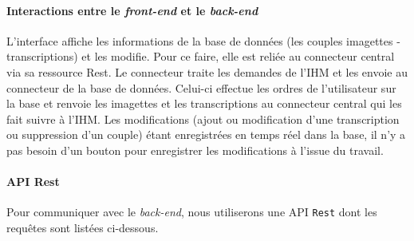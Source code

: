 \paragraph{Interactions entre le \textit{front-end} et le \textit{back-end}}

L’interface affiche les informations de la base de données (les couples imagettes - transcriptions) et les modifie. Pour ce faire, elle est reliée au connecteur central via sa ressource Rest. Le connecteur traite les demandes de l’IHM et les envoie au connecteur de la base de données. Celui-ci effectue les ordres de l’utilisateur sur la base et renvoie les imagettes et les transcriptions au connecteur central qui les fait suivre à l’IHM. Les modifications (ajout ou modification d’une transcription ou suppression d’un couple) étant enregistrées en temps réel dans la base, il n’y a pas besoin d’un bouton pour enregistrer les modifications à l’issue du travail.

\newpage{}

\paragraph{API Rest}
Pour communiquer avec le \textit{back-end}, nous utiliserons une API \texttt{Rest} dont les requêtes sont listées ci-dessous.
\newline{}

